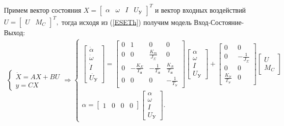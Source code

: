 \documentclass[12pt,a4paper]{article}
\begin{document}
Примем вектор состояния
$
	X =
	\begin{bmatrix}
		\alpha & \omega & I & U_\text{У}
	\end{bmatrix}^T
$
и вектор входных воздействий
$
	U =
	\begin{bmatrix}
		U & M_C
	\end{bmatrix}^T,
$
тогда исходя из (\ref{ESETh}) получим модель Вход-Состояние-Выход:
\begin{align}
	\begin{cases}
		\dot{X} = AX + BU\\
		y = CX
	\end{cases} \Rightarrow
	\begin{cases}
		\begin{bmatrix}
			\dot{\alpha}\\
			\dot{\omega}\\
			\dot{I}\\
			\dot{U_\text{У}}
		\end{bmatrix} =
		\begin{bmatrix}
			0 & 1 & 0 & 0\\
			0 & 0 & \displaystyle{\frac{K_m}{J_\Sigma}} & 0\\
			0 & -\displaystyle{\frac{K_E}{T_\text{Я}}} & -\displaystyle{\frac{1}{T_\text{Я}}} & \displaystyle{\frac{K_\text{Д}}{T_\text{Я}}}\\
			0 & 0 & 0 & -\displaystyle{\frac{1}{T_\text{У}}}
		\end{bmatrix}
		\begin{bmatrix}
			\alpha\\
			\omega\\
			I\\
			U_\text{У}
		\end{bmatrix}
		+
		\begin{bmatrix}
			0 & 0\\
			0 & -\displaystyle{\frac{1}{J_\Sigma}}\\
			0 & 0\\
			\displaystyle{\frac{K_\text{У}}{T_\text{У}}} & 0
		\end{bmatrix}
		\begin{bmatrix}
			U\\
			M_C
		\end{bmatrix}\\
		\alpha = 
		\begin{bmatrix}
			1 & 0 & 0 & 0
		\end{bmatrix}
		\begin{bmatrix}
			\alpha\\
			\omega\\
			I\\
			U_\text{У}
		\end{bmatrix}.
	\end{cases}
	\label{ESEFull}
\end{align}
	
\end{document}
